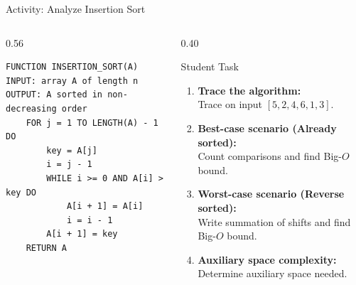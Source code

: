 \documentclass[aspectratio=169]{beamer}
\begin{document}
\begin{frame}[fragile]{Activity: Analyze Insertion Sort}
  \small
  \begin{columns}[T]
    \begin{column}{0.56\textwidth}
\begin{lstlisting}[style=pseudonumbered,basicstyle=\ttfamily\scriptsize]
FUNCTION INSERTION_SORT(A)
INPUT: array A of length n
OUTPUT: A sorted in non-decreasing order
    FOR j = 1 TO LENGTH(A) - 1 DO
        key = A[j]
        i = j - 1
        WHILE i >= 0 AND A[i] > key DO
            A[i + 1] = A[i]
            i = i - 1
        A[i + 1] = key
    RETURN A
\end{lstlisting}
    \end{column}
    \begin{column}{0.40\textwidth}
      \begin{block}{Student Task}
        \scriptsize
        \begin{enumerate}\setlength{\itemsep}{0.25em}
          \item \textbf{Trace the algorithm:}\\
            Trace on input $[5, 2, 4, 6, 1, 3]$.
          \item \textbf{Best-case scenario (Already sorted):}\\
            Count comparisons and find Big-$O$ bound.
          \item \textbf{Worst-case scenario (Reverse sorted):}\\
            Write summation of shifts and find Big-$O$ bound.
          \item \textbf{Auxiliary space complexity:}\\
            Determine auxiliary space needed.
        \end{enumerate}
      \end{block}
    \end{column}
  \end{columns}
\end{frame}
\end{document}

